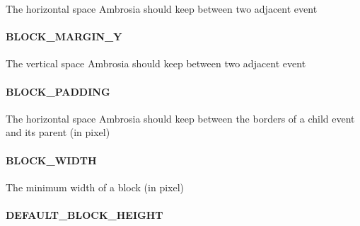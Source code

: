 \documentclass[letterpaper,10pt,english]{sphinxmanual}
\begin{document}
\begin{fulllineitems}
\label{ambrosia_web.event:BLOCK_MARGIN_X}
\end{fulllineitems}


The horizontal space Ambrosia should keep between two adjacent event


\paragraph{BLOCK\_MARGIN\_Y}
\label{ambrosia_web.event:block-margin-y}

\begin{fulllineitems}
\label{ambrosia_web.event:BLOCK_MARGIN_Y}
\end{fulllineitems}


The vertical space Ambrosia should keep between two adjacent event


\paragraph{BLOCK\_PADDING}
\label{ambrosia_web.event:block-padding}

\begin{fulllineitems}
\label{ambrosia_web.event:BLOCK_PADDING}
\end{fulllineitems}


The horizontal space Ambrosia should keep between the borders of a child event and its parent (in pixel)


\paragraph{BLOCK\_WIDTH}
\label{ambrosia_web.event:block-width}

\begin{fulllineitems}
\label{ambrosia_web.event:BLOCK_WIDTH}
\end{fulllineitems}


The minimum width of a block (in pixel)


\paragraph{DEFAULT\_BLOCK\_HEIGHT}
\label{ambrosia_web.event:default-block-height}
\end{document}
